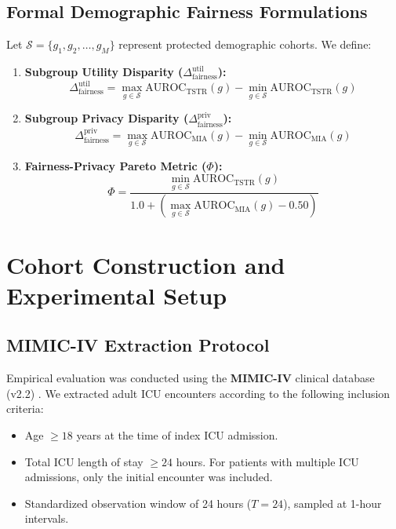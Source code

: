 \documentclass[journal]{IEEEtran}
\begin{document}
\subsection{Formal Demographic Fairness Formulations}
Let $\mathcal{S} = \{g_1, g_2, \dots, g_M\}$ represent protected demographic cohorts. We define:
\begin{enumerate}
    \item \textbf{Subgroup Utility Disparity ($\Delta_{\text{fairness}}^{\text{util}}$):}
    \begin{equation}
    \Delta_{\text{fairness}}^{\text{util}} = \max_{g \in \mathcal{S}} \text{AUROC}_{\text{TSTR}}(g) - \min_{g \in \mathcal{S}} \text{AUROC}_{\text{TSTR}}(g)
    \end{equation}
    \item \textbf{Subgroup Privacy Disparity ($\Delta_{\text{fairness}}^{\text{priv}}$):}
    \begin{equation}
    \Delta_{\text{fairness}}^{\text{priv}} = \max_{g \in \mathcal{S}} \text{AUROC}_{\text{MIA}}(g) - \min_{g \in \mathcal{S}} \text{AUROC}_{\text{MIA}}(g)
    \end{equation}
    \item \textbf{Fairness-Privacy Pareto Metric ($\Phi$):}
    \begin{equation}
    \Phi = \frac{\min_{g \in \mathcal{S}} \text{AUROC}_{\text{TSTR}}(g)}{1.0 + \left(\max_{g \in \mathcal{S}} \text{AUROC}_{\text{MIA}}(g) - 0.50\right)}
    \end{equation}
\end{enumerate}

\section{Cohort Construction and Experimental Setup}

\subsection{MIMIC-IV Extraction Protocol}
Empirical evaluation was conducted using the \textbf{MIMIC-IV} clinical database (v2.2) \cite{johnson2023mimic}. We extracted adult ICU encounters according to the following inclusion criteria:
\begin{itemize}
    \item Age $\ge 18$ years at the time of index ICU admission.
    \item Total ICU length of stay $\ge 24$ hours. For patients with multiple ICU admissions, only the initial encounter was included.
    \item Standardized observation window of 24 hours ($T = 24$), sampled at 1-hour intervals.
\end{itemize}
\end{document}
